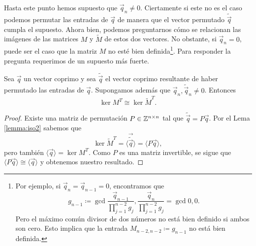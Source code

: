 Hasta este punto hemos supuesto que $\vec{q}_n \neq 0$. Ciertamente si este no es el caso podemos
permutar las entradas de $\vec{q}$ de manera que el vector permutado $\tilde{\vec{q}}$ cumpla el
supuesto. Ahora bien, podemos preguntarnos cómo se relacionan las imágenes de las matrices $M$ y
$\tilde{M}$ de estos dos vectores. No obstante, si $\vec{q}_n = 0$, puede ser el caso que la matriz
$M$ no esté bien definida\footnote{
	Por ejemplo, si $\vec{q}_n = \vec{q}_{n-1} = 0$, encontramos que
	\begin{equation*}
		g_{n-1} \coloneq \gcd{\frac{\vec{q}_{n-1}}{\prod_{j=1}^{n-2}g_j},
		\frac{\vec{q}_n}{\prod_{j=1}^{n-2}g_j}} = \gcd{0, 0}.
	\end{equation*}
	Pero el máximo común divisor de dos números no está bien definido si ambos son cero. Esto
	implica que la entrada $M_{n-2, n-2} \coloneq g_{n-1}$ no está bien definida.
}. Para responder la pregunta requerimos de un supuesto más fuerte.
\begin{corollary}
	\label{cor:iso3}
	Sea $\vec{q}$ un vector coprimo y sea $\tilde{\vec{q}}$ el vector coprimo resultante de haber
	permutado las entradas de $\vec{q}$. Supongamos además que $\vec{q}_n, \tilde{\vec{q}}_n \neq 0$.
	Entonces
	\begin{equation*}
		\ker{M^T} \cong \ker{\tilde{M}^T}.
	\end{equation*}
\end{corollary}
\begin{proof}
	Existe una matriz de permutación $P \in \mathbb{Z}^{n \times n}$ tal que $\tilde{\vec{q}} = P\vec{q}$.
	Por el Lema \ref{lemma:iso2} sabemos que
	\begin{equation*}
		\ker{\tilde{M}^T} = \langle \vec{\tilde{\vec{q}}} \rangle = \langle P\vec{q} \rangle,
	\end{equation*}
	pero también $\langle \vec{q} \rangle = \ker{M^T}$. Como $P$ es una matriz invertible, se sigue
	que $\langle P\vec{q} \rangle \cong \langle \vec{q} \rangle$ y obtenemos nuestro resultado.
\end{proof}
